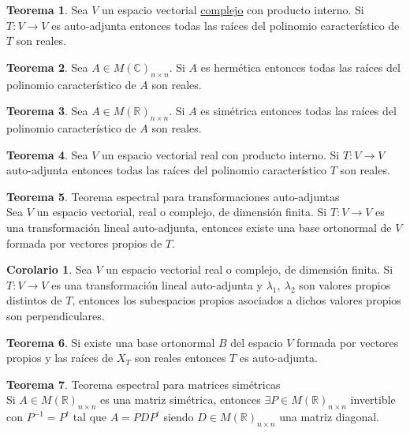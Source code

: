 \documentclass[10pt]{article}
\theoremstyle{definition}
\newtheorem{theorem}{Teorema}[section]
\newtheorem{corollary}{Corolario}[theorem]
\begin{document}
\begin{theorem}
	Sea $V$ un espacio vectorial \underline{complejo} con producto interno. Si $T:V\to V$ es auto-adjunta entonces todas las raíces del polinomio característico de $T$ son reales.
\end{theorem}
\begin{theorem}
	Sea $A\in M(\mathbb{C})_{n\times n}$. Si $A$ es hermética entonces todas las raíces del polinomio característico de $A$ son reales.
\end{theorem}
\begin{theorem}
	Sea $A\in M(\mathbb{R})_{n\times n}$. Si $A$ es simétrica entonces todas las raíces del polinomio característico de $A$ son reales.
\end{theorem}
\begin{theorem}
	Sea $V$ un espacio vectorial real con producto interno. Si $T:V\to V$ auto-adjunta entonces todas las raíces del polinomio característico $T$ son reales.
\end{theorem}
\begin{theorem}{Teorema espectral para transformaciones auto-adjuntas}
	\\Sea $V$ un espacio vectorial, real o complejo, de dimensión finita. Si $T:V\to V$ es una transformación lineal auto-adjunta, entonces existe una base ortonormal de $V$ formada por vectores propios de $T$.
\end{theorem}
\begin{corollary}
	Sea $V$ un espacio vectorial real o complejo, de dimensión finita. Si $T:V\to V$ es una transformación lineal auto-adjunta y $\lambda_1,\ \lambda_2$ son valores propios distintos de $T$, entonces los subespacios propios asociados a dichos valores propios son perpendiculares.
\end{corollary}
\begin{theorem}
	Si existe una base ortonormal $B$ del espacio $V$ formada por vectores propios y las raíces de $X_T$ son reales entonces $T$ es auto-adjunta.
\end{theorem}
\begin{theorem}{Teorema espectral para matrices simétricas}
    \\Si $A\in M(\mathbb{R})_{n\times n}$ es una matriz simétrica, entonces $\exists P\in M(\mathbb{R})_{n\times n}$ invertible con $P^{-1}=P^t$ tal que $A=PDP^t$ siendo $D\in M(\mathbb{R})_{n\times n}$ una matriz diagonal.
\end{theorem}
\end{document}

